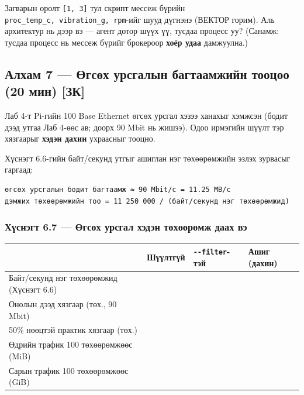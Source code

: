 Загварын оролт \texttt{{[}1,\ 3{]}} тул скрипт мессеж бүрийн \texttt{proc\_\allowbreak{}temp\_\allowbreak{}c,\ vibration\_\allowbreak{}g,\ rpm}-ийг шууд дүгнэнэ (ВЕКТОР горим). Аль архитектур нь дээр вэ --- агент дотор шүүх үү, тусдаа процесс уу? (Санамж: тусдаа процесс нь мессеж бүрийг брокероор \textbf{хоёр удаа} дамжуулна.)

\hypertarget{ux430ux43bux445ux430ux43c-7-ux4e9ux433ux441ux4e9ux445-ux443ux440ux441ux433ux430ux43bux44bux43d-ux431ux430ux433ux442ux430ux430ux43cux436ux438ux439ux43d-ux442ux43eux43eux446ux43eux43e-20-ux43cux438ux43d-ux437ux43a}{%
\subsection{Алхам 7 --- Өгсөх урсгалын багтаамжийн тооцоо (20 мин) {[}ЗК{]}}\label{ux430ux43bux445ux430ux43c-7-ux4e9ux433ux441ux4e9ux445-ux443ux440ux441ux433ux430ux43bux44bux43d-ux431ux430ux433ux442ux430ux430ux43cux436ux438ux439ux43d-ux442ux43eux43eux446ux43eux43e-20-ux43cux438ux43d-ux437ux43a}}

Лаб 4-т Pi-гийн 100 Base Ethernet өгсөх урсгал хэзээ ханахыг хэмжсэн (бодит дээд утгаа Лаб 4-өөс ав; доорх 90 Mbit нь жишээ). Одоо ирмэгийн шүүлт тэр хязгаарыг \textbf{хэдэн дахин} ухраасныг тооцно.

Хүснэгт 6.6-гийн байт/секунд утгыг ашиглан нэг төхөөрөмжийн эзлэх зурвасыг гаргаад:

\begin{verbatim}
өгсөх урсгалын бодит багтаамж ≈ 90 Mbit/с = 11.25 MB/с
дэмжих төхөөрөмжийн тоо = 11 250 000 / (байт/секунд нэг төхөөрөмжид)
\end{verbatim}

\hypertarget{ux445ux4afux441ux43dux44dux433ux442-6.7-ux4e9ux433ux441ux4e9ux445-ux443ux440ux441ux433ux430ux43b-ux445ux44dux434ux44dux43d-ux442ux4e9ux445ux4e9ux4e9ux440ux4e9ux43cux436-ux434ux430ux430ux445-ux432ux44d}{%
\subsubsection{Хүснэгт 6.7 --- Өгсөх урсгал хэдэн төхөөрөмж даах вэ}\label{ux445ux4afux441ux43dux44dux433ux442-6.7-ux4e9ux433ux441ux4e9ux445-ux443ux440ux441ux433ux430ux43b-ux445ux44dux434ux44dux43d-ux442ux4e9ux445ux4e9ux4e9ux440ux4e9ux43cux436-ux434ux430ux430ux445-ux432ux44d}}

\begingroup\scriptsize\begin{longtable}[]{@{}llll@{}}
\toprule
& Шүүлтгүй & \texttt{-\/-filter}-тэй & Ашиг (дахин)\tabularnewline
\midrule
\endhead
Байт/секунд нэг төхөөрөмжид (Хүснэгт 6.6) & & &\tabularnewline
Онолын дээд хязгаар (төх., 90 Mbit) & & &\tabularnewline
50\% нөөцтэй практик хязгаар (төх.) & & &\tabularnewline
Өдрийн трафик 100 төхөөрөмжөөс (MiB) & & &\tabularnewline
Сарын трафик 100 төхөөрөмжөөс (GiB) & & &\tabularnewline
\bottomrule
\end{longtable}\endgroup

